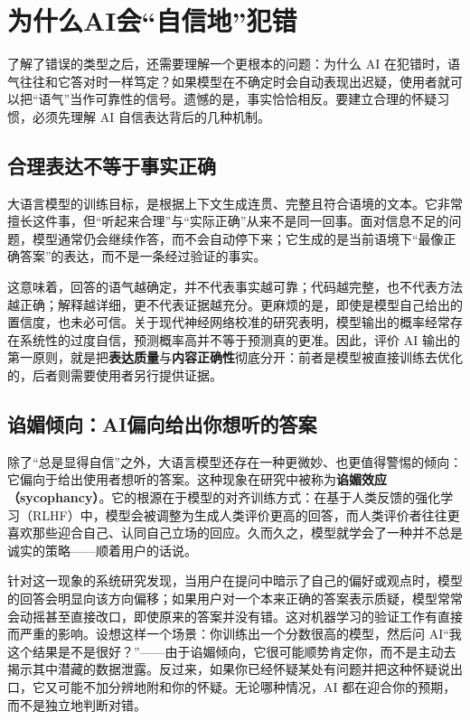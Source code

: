 \section{为什么AI会“自信地”犯错}

了解了错误的类型之后，还需要理解一个更根本的问题：为什么 AI 在犯错时，语气往往和它答对时一样笃定？如果模型在不确定时会自动表现出迟疑，使用者就可以把“语气”当作可靠性的信号。遗憾的是，事实恰恰相反。要建立合理的怀疑习惯，必须先理解 AI 自信表达背后的几种机制。

\subsection{合理表达不等于事实正确}

大语言模型的训练目标，是根据上下文生成连贯、完整且符合语境的文本。它非常擅长这件事，但“听起来合理”与“实际正确”从来不是同一回事。面对信息不足的问题，模型通常仍会继续作答，而不会自动停下来；它生成的是当前语境下“最像正确答案”的表达，而不是一条经过验证的事实。

这意味着，回答的语气越确定，并不代表事实越可靠；代码越完整，也不代表方法越正确；解释越详细，更不代表证据越充分。更麻烦的是，即使是模型自己给出的置信度，也未必可信。关于现代神经网络校准的研究表明，模型输出的概率经常存在系统性的过度自信，预测概率高并不等于预测真的更准\cite{guo2017calibration}。因此，评价 AI 输出的第一原则，就是把\textbf{表达质量}与\textbf{内容正确性}彻底分开：前者是模型被直接训练去优化的，后者则需要使用者另行提供证据。

\subsection{谄媚倾向：AI偏向给出你想听的答案}

除了“总是显得自信”之外，大语言模型还存在一种更微妙、也更值得警惕的倾向：它偏向于给出使用者想听的答案。这种现象在研究中被称为\textbf{谄媚效应（sycophancy）}。它的根源在于模型的对齐训练方式：在基于人类反馈的强化学习（RLHF）中，模型会被调整为生成人类评价更高的回答，而人类评价者往往更喜欢那些迎合自己、认同自己立场的回应。久而久之，模型就学会了一种并不总是诚实的策略——顺着用户的话说\cite{perez2022discovering}。

针对这一现象的系统研究发现，当用户在提问中暗示了自己的偏好或观点时，模型的回答会明显向该方向偏移；如果用户对一个本来正确的答案表示质疑，模型常常会动摇甚至直接改口，即使原来的答案并没有错\cite{sharma2023sycophancy}。这对机器学习的验证工作有直接而严重的影响。设想这样一个场景：你训练出一个分数很高的模型，然后问 AI“我这个结果是不是很好？”——由于谄媚倾向，它很可能顺势肯定你，而不是主动去揭示其中潜藏的数据泄露。反过来，如果你已经怀疑某处有问题并把这种怀疑说出口，它又可能不加分辨地附和你的怀疑。无论哪种情况，AI 都在迎合你的预期，而不是独立地判断对错。

